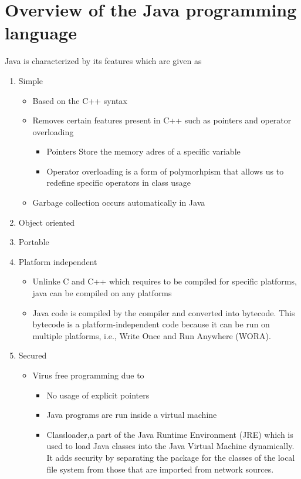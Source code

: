 \documentclass{article}
\begin{document}
\section{Overview of the Java programming language}

Java is characterized by its features which are given as
\begin{enumerate}
    \item Simple
    \begin{itemize}
        \item Based on the C++ syntax
        \item Removes certain features present in C++ such as pointers and operator overloading
        \begin{itemize}
            \item Pointers Store the memory adres of a specific variable
            \item Operator overloading is a form of polymorhpism that allows us to redefine specific operators in class usage
        \end{itemize}
        \item Garbage collection occurs automatically in Java
    \end{itemize}
    \item Object oriented
    \item Portable
    \item Platform independent
    \begin{itemize}
        \item Unlinke C and C++ which requires to be compiled for specific platforms, java can be compiled on any platforms
        \item Java code is compiled by the compiler and converted into bytecode. This bytecode is a platform-independent code because it can be run on multiple platforms, i.e., Write Once and Run Anywhere (WORA).
    \end{itemize}
    \item Secured
    \begin{itemize}
        \item Virus free programming due to 
        \begin{itemize}
            \item No usage of explicit pointers
            \item Java programs are run inside a virtual machine 
            \item Classloader,a part of the Java Runtime Environment (JRE) which is used to load Java classes into the Java Virtual Machine dynamically. It adds security by separating the package for the classes of the local file system from those that are imported from network sources.

\end{itemize}
\end{itemize}
\end{enumerate}
\end{document}

